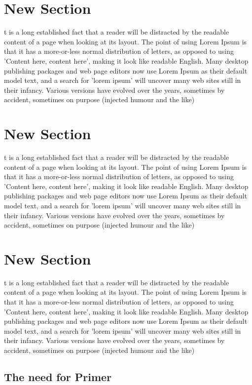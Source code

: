 \documentclass[]{article}
\begin{document}
\section{New Section}
t is a long established fact that a reader will be distracted by the readable content of a page when looking at its layout. The point of using Lorem Ipsum is that it has a more-or-less normal distribution of letters, as opposed to using 'Content here, content here', making it look like readable English. Many desktop publishing packages and web page editors now use Lorem Ipsum as their default model text, and a search for 'lorem ipsum' will uncover many web sites still in their infancy. Various versions have evolved over the years, sometimes by accident, sometimes on purpose (injected humour and the like)
\section{New Section}
t is a long established fact that a reader will be distracted by the readable content of a page when looking at its layout. The point of using Lorem Ipsum is that it has a more-or-less normal distribution of letters, as opposed to using 'Content here, content here', making it look like readable English. Many desktop publishing packages and web page editors now use Lorem Ipsum as their default model text, and a search for 'lorem ipsum' will uncover many web sites still in their infancy. Various versions have evolved over the years, sometimes by accident, sometimes on purpose (injected humour and the like)
\section{New Section}
t is a long established fact that a reader will be distracted by the readable content of a page when looking at its layout. The point of using Lorem Ipsum is that it has a more-or-less normal distribution of letters, as opposed to using 'Content here, content here', making it look like readable English. Many desktop publishing packages and web page editors now use Lorem Ipsum as their default model text, and a search for 'lorem ipsum' will uncover many web sites still in their infancy. Various versions have evolved over the years, sometimes by accident, sometimes on purpose (injected humour and the like)


\subsection{The need for Primer}
\medskip
{}

 \thispagestyle{plainx}
\end{document}
